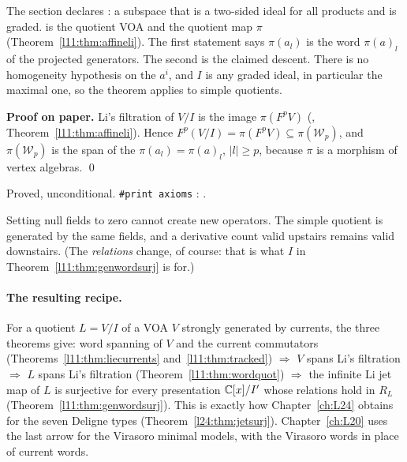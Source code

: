 \begin{dictionary}
The section  declares :
a subspace that is a two-sided ideal for all products and is graded.  is the quotient
VOA and  the quotient map $\pi$ (Theorem~\ref{l11:thm:affineli}). The first statement says $\pi(a_l)$ is the
word $\pi(a)_l$ of the projected generators. The second is the claimed descent. There is no homogeneity hypothesis on
the $a^i$, and $I$ is any graded ideal, in particular the maximal one, so the theorem applies to simple quotients.
\end{dictionary}

\textbf{Proof on paper.} Li's filtration of $V/I$ is the image $\pi(F^pV)$
(\allowbreak{}\allowbreak{}, Theorem~\ref{l11:thm:affineli}). Hence
$F^p(V/I) = \pi(F^pV)\subseteq\pi(\mathcal W_p)$, and $\pi(\mathcal W_p)$ is the span of the $\pi(a_l) = \pi(a)_l$, $|l|\ge p$, because $\pi$ is a
morphism of vertex algebras. \qed

\begin{status}
Proved, unconditional. \texttt{\#print axioms}
\allowbreak{}\allowbreak{}: \lean{[propext, Classical.}\allowbreak{}\allowbreak\lean{sound]}.
\end{status}

\begin{physics}
Setting null fields to zero cannot create new operators. The simple quotient is generated by the same fields, and a
derivative count valid upstairs remains valid downstairs. (The \emph{relations} change, of course: that is what $I$ in
Theorem~\ref{l11:thm:genwordsurj} is for.)
\end{physics}

\paragraph{The resulting recipe.} For a quotient $L = V/I$ of a VOA $V$ strongly generated by currents, the three theorems
give: word spanning of $V$ and the current commutators (Theorems~\ref{l11:thm:liecurrents} and~\ref{l11:thm:tracked})
$\Rightarrow$ $V$ spans Li's filtration $\Rightarrow$ $L$ spans Li's filtration (Theorem~\ref{l11:thm:wordquot}) $\Rightarrow$
the infinite Li jet map of $L$ is surjective for every presentation ${\mathbb{C}}[x]/I'$ whose relations hold in $R_L$
(Theorem~\ref{l11:thm:genwordsurj}). This is exactly how Chapter~\ref{ch:L24} obtains  for the
seven Deligne types (Theorem~\ref{l24:thm:jetsurj}). Chapter~\ref{ch:L20} uses the last arrow for the Virasoro minimal
models, with the Virasoro words in place of current words.

